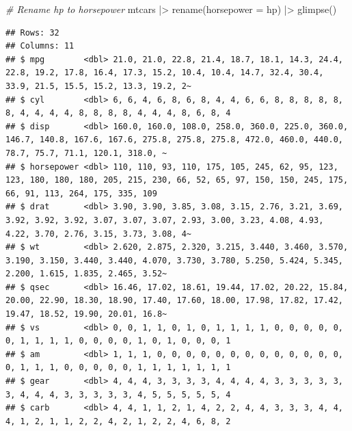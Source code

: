 \documentclass[
  12pt,
  oneside]{book}
\newenvironment{Shaded}{\begin{snugshade}}{\end{snugshade}}
\newcommand{\AttributeTok}[1]{\textcolor[rgb]{0.77,0.63,0.00}{#1}}
\newcommand{\CommentTok}[1]{\textcolor[rgb]{0.56,0.35,0.01}{\textit{#1}}}
\newcommand{\FunctionTok}[1]{\textcolor[rgb]{0.00,0.00,0.00}{#1}}
\newcommand{\NormalTok}[1]{#1}
\newcommand{\SpecialCharTok}[1]{\textcolor[rgb]{0.00,0.00,0.00}{#1}}
\theoremstyle{definition}
\theoremstyle{definition}
\theoremstyle{definition}
\theoremstyle{definition}
\theoremstyle{remark}
\begin{document}
\begin{Shaded}
\begin{Highlighting}[]
\CommentTok{\# Rename hp to horsepower}
\NormalTok{mtcars }\SpecialCharTok{|\textgreater{}} 
  \FunctionTok{rename}\NormalTok{(}\AttributeTok{horsepower =}\NormalTok{ hp) }\SpecialCharTok{|\textgreater{}} 
  \FunctionTok{glimpse}\NormalTok{()}
\end{Highlighting}
\end{Shaded}

\begin{verbatim}
## Rows: 32
## Columns: 11
## $ mpg        <dbl> 21.0, 21.0, 22.8, 21.4, 18.7, 18.1, 14.3, 24.4, 22.8, 19.2, 17.8, 16.4, 17.3, 15.2, 10.4, 10.4, 14.7, 32.4, 30.4, 33.9, 21.5, 15.5, 15.2, 13.3, 19.2, 2~
## $ cyl        <dbl> 6, 6, 4, 6, 8, 6, 8, 4, 4, 6, 6, 8, 8, 8, 8, 8, 8, 4, 4, 4, 4, 8, 8, 8, 8, 4, 4, 4, 8, 6, 8, 4
## $ disp       <dbl> 160.0, 160.0, 108.0, 258.0, 360.0, 225.0, 360.0, 146.7, 140.8, 167.6, 167.6, 275.8, 275.8, 275.8, 472.0, 460.0, 440.0, 78.7, 75.7, 71.1, 120.1, 318.0, ~
## $ horsepower <dbl> 110, 110, 93, 110, 175, 105, 245, 62, 95, 123, 123, 180, 180, 180, 205, 215, 230, 66, 52, 65, 97, 150, 150, 245, 175, 66, 91, 113, 264, 175, 335, 109
## $ drat       <dbl> 3.90, 3.90, 3.85, 3.08, 3.15, 2.76, 3.21, 3.69, 3.92, 3.92, 3.92, 3.07, 3.07, 3.07, 2.93, 3.00, 3.23, 4.08, 4.93, 4.22, 3.70, 2.76, 3.15, 3.73, 3.08, 4~
## $ wt         <dbl> 2.620, 2.875, 2.320, 3.215, 3.440, 3.460, 3.570, 3.190, 3.150, 3.440, 3.440, 4.070, 3.730, 3.780, 5.250, 5.424, 5.345, 2.200, 1.615, 1.835, 2.465, 3.52~
## $ qsec       <dbl> 16.46, 17.02, 18.61, 19.44, 17.02, 20.22, 15.84, 20.00, 22.90, 18.30, 18.90, 17.40, 17.60, 18.00, 17.98, 17.82, 17.42, 19.47, 18.52, 19.90, 20.01, 16.8~
## $ vs         <dbl> 0, 0, 1, 1, 0, 1, 0, 1, 1, 1, 1, 0, 0, 0, 0, 0, 0, 1, 1, 1, 1, 0, 0, 0, 0, 1, 0, 1, 0, 0, 0, 1
## $ am         <dbl> 1, 1, 1, 0, 0, 0, 0, 0, 0, 0, 0, 0, 0, 0, 0, 0, 0, 1, 1, 1, 0, 0, 0, 0, 0, 1, 1, 1, 1, 1, 1, 1
## $ gear       <dbl> 4, 4, 4, 3, 3, 3, 3, 4, 4, 4, 4, 3, 3, 3, 3, 3, 3, 4, 4, 4, 3, 3, 3, 3, 3, 4, 5, 5, 5, 5, 5, 4
## $ carb       <dbl> 4, 4, 1, 1, 2, 1, 4, 2, 2, 4, 4, 3, 3, 3, 4, 4, 4, 1, 2, 1, 1, 2, 2, 4, 2, 1, 2, 2, 4, 6, 8, 2
\end{verbatim}
\end{document}
